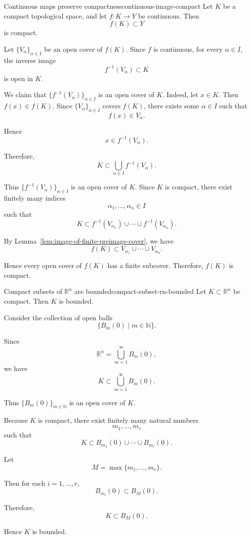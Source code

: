 \documentclass[UTF8,12pt,a4paper]{ctexart}
\makeatletter
\numberwithin{equation}{section}
\newcommand{\currentProofColor}{black}
\renewenvironment{proof}[1][Proof]{%
  \par
  \begingroup
  \edef\proofQEDColor{\currentProofColor}%
  \renewcommand{\qedsymbol}{\textcolor{\proofQEDColor}{$\blacksquare$}}%
  \pushQED{\qed}%
  \normalfont
  \topsep6\p@\@plus6\p@\relax
  \trivlist
  \item[\hskip\labelsep\bfseries\itshape #1\@addpunct{.}]\ignorespaces
}{%
  \popQED
  \endtrivlist
  \@endpefalse
  \endgroup
}
\makeatother
\begin{document}
\begin{prop}{Continuous maps preserve compactness}{continuous-image-compact}
Let \(K\) be a compact topological space, and let \(f:K\to Y\) be continuous.
Then
$$
f(K)\subset Y
$$
is compact.
\end{prop}

\begin{proof}
Let \(\{V_\alpha\}_{\alpha\in I}\) be an open cover of \(f(K)\). Since \(f\) is continuous, for every \(\alpha\in I\), the inverse image
$$
f^{-1}(V_\alpha)\subset K
$$
is open in \(K\).

We claim that \(\{f^{-1}(V_\alpha)\}_{\alpha\in I}\) is an open cover of \(K\). Indeed, let \(x\in K\). Then \(f(x)\in f(K)\). Since \(\{V_\alpha\}_{\alpha\in I}\) covers \(f(K)\), there exists some \(\alpha\in I\) such that
$$
f(x)\in V_\alpha.
$$

Hence
$$
x\in f^{-1}(V_\alpha).
$$

Therefore,
$$
K\subset \bigcup_{\alpha\in I} f^{-1}(V_\alpha).
$$

Thus \(\{f^{-1}(V_\alpha)\}_{\alpha\in I}\) is an open cover of \(K\). Since \(K\) is compact, there exist finitely many indices
$$
\alpha_1,\dots,\alpha_n\in I
$$
such that
$$
K\subset f^{-1}(V_{\alpha_1})\cup\cdots\cup f^{-1}(V_{\alpha_n}).
$$

By Lemma~\ref{lem:image-of-finite-preimage-cover}, we have
$$
f(K)\subset V_{\alpha_1}\cup\cdots\cup V_{\alpha_n}.
$$

Hence every open cover of \(f(K)\) has a finite subcover. Therefore, \(f(K)\) is compact.
\end{proof}

\begin{prop}{Compact subsets of $\mathbb{R}^n$ are bounded}{compact-subset-rn-bounded}
Let $K\subset\mathbb{R}^n$ be compact. Then $K$ is bounded.
\end{prop}

\begin{proof}
Consider the collection of open balls
$$
\{B_m(0)\mid m\in\mathbb{N}\}.
$$

Since
$$
\mathbb{R}^n=\bigcup_{m=1}^{\infty}B_m(0),
$$
we have
$$
K\subset \bigcup_{m=1}^{\infty}B_m(0).
$$

Thus $\{B_m(0)\}_{m\in\mathbb{N}}$ is an open cover of $K$.

Because $K$ is compact, there exist finitely many natural numbers
$$
m_1,\dots,m_r
$$
such that
$$
K\subset B_{m_1}(0)\cup\cdots\cup B_{m_r}(0).
$$

Let
$$
M=\max\{m_1,\dots,m_r\}.
$$

Then for each $i=1,\dots,r$,
$$
B_{m_i}(0)\subset B_M(0).
$$

Therefore,
$$
K\subset B_M(0).
$$

Hence $K$ is bounded.
\end{proof}
\end{document}
